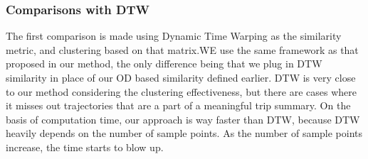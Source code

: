 \subsubsection{Comparisons with DTW}
The first comparison is made using Dynamic Time Warping as the similarity metric, and clustering based on that matrix.WE use the same framework as that proposed in our method, the only difference being that we plug in DTW similarity in place of our OD based similarity defined earlier. DTW is very close to our method considering the clustering effectiveness, but there are cases where it misses out trajectories that are a part of a meaningful trip summary. On the basis of computation time, our approach is way faster than DTW, because DTW heavily depends on the number of sample points. As the number of sample points increase, the time starts to blow up.

